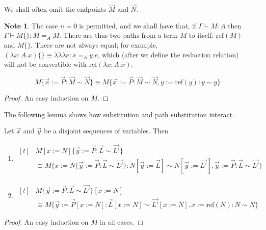 \documentclass[a4paper,UKenglish]{lipics-v2016}
\newcommand*{\reff}[1]{\ensuremath{\mathrm{ref} \left( {#1} \right)}}
\newcommand*{\triplelambda}{\ensuremath{\lambda \!\! \lambda \!\! \lambda}}
\theoremstyle{definition}
\newtheorem{note}[theorem]{Note}
\begin{document}
We shall often omit the endpoints $\vec{M}$ and $\vec{N}$.

\begin{note}
The case $n = 0$ is permitted, and we shall have that, if $\Gamma \vdash M : A$ then $\Gamma \vdash M \{\} : M =_A M$.  There are thus two paths from a term $M$ to itself: $\reff{M}$ and $M \{\}$.  There are not always equal; for example, $(\lambda x:A.x) \{\} \equiv \triplelambda e : x =_A y. e$, which (after we define the reduction relation) will not be convertible with $\reff{\lambda x:A.x}$.
\end{note}

\begin{lemma}
\[ M \{ \vec{x} := \vec{P} : \vec{M} \sim \vec{N} \} \equiv M \{ \vec{x} := \vec{P} : \vec{M} \sim \vec{N}, y := \reff{y} : y \sim y \} \]
\end{lemma}

\begin{proof}
An easy induction on $M$.
\end{proof}

The following lemma shows how substitution and path substitution interact.

\begin{lemma}[Substitution]
\label{lm:subpathsub}
Let $\vec{x}$ and $\vec{y}$ be a disjoint sequences of variables.  Then
\begin{enumerate}
\item
\label{lm:subpathsubi}
$ \begin{aligned}[t]
& M [ x:= N ] \{ \vec{y} := \vec{P} : \vec{L} \sim \vec{L'} \} \\
& \equiv M \{ x := N \{ \vec{y} := \vec{P} : \vec{L} \sim \vec{L'} \} : N [ \vec{y}:= \vec{L} ] \sim N [ \vec{y} := \vec{L'} ], \vec{y} := \vec{P} : \vec{L} \sim \vec{L'} \}
\end{aligned} $
\item
\label{lm:subpathsubii}
$ \begin{aligned}[t]
& M \{ \vec{y} := \vec{P} : \vec{L} \sim \vec{L'} \} [ x := N ] \\
& \equiv M \{ \vec{y} := \vec{P} [x := N] : \vec{L} [x := N] \sim \vec{L'} [x := N], x := \reff{N} : N \sim N \}
\end{aligned} $
\end{enumerate}
\end{lemma}

\begin{proof}
An easy induction on $M$ in all cases.
\end{proof}
\end{document}
